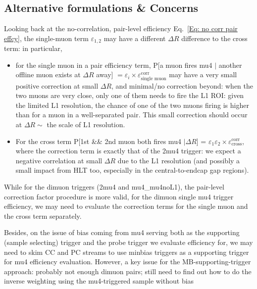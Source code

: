 \documentclass[11pt]{article}
\begin{document}
\subsection*{Alternative formulations \& Concerns}
Looking back at the no-correlation, pair-level efficiency Eq.~\ref{Eq: no corr pair effcy}, the single-muon term $\varepsilon_{1,2}$ may have a different $\Delta R$ difference to the cross term: in particular,
\begin{itemize}
    \item for the single muon in a pair efficiency term, P[a muon fires mu4 $\mid$ another offline muon exists at $\Delta R$ away] $= \varepsilon_{i} \times \varepsilon^{\textrm{corr}}_{\textrm{single muon}}$ may have a very small positive correction at small $\Delta R$, and minimal/no correction beyond: when the two muons are very close, only one of them needs to fire the L1 ROI: given the limited L1 resolution, the chance of one of the two muons firing is higher than for a muon in a well-separated pair. This small correction should occur at $\Delta R \sim$ the scale of L1 resolution.
    \item For the cross term P[1st \&\& 2nd muon both fires mu4 $\mid\Delta R$] = $\varepsilon_{1} \varepsilon_{2} \times \varepsilon^{\textrm{corr}}_{\textrm{cross}}$, where the correction term is exactly that of the 2mu4 trigger: we expect a negative correlation at small $\Delta R$ due to the L1 resolution (and possibly a small impact from HLT too, especially in the central-to-endcap gap regions).
\end{itemize}
While for the dimuon triggers (2mu4 and mu4\_mu4noL1), the pair-level correction factor procedure is more valid, for the dimuon single mu4 trigger efficiency, we may need to evaluate the correction terms for the single muon and the cross term separately.

Besides, on the issue of bias coming from mu4 serving both as the supporting (sample selecting) trigger and the probe trigger we evaluate efficiency for, we may need to skim CC and PC streams to use minbias triggers as a supporting trigger for mu4 efficiency evaluation. However, a key issue for the MB-supporting-trigger approach: probably not enough dimuon pairs; still need to find out how to do the inverse weighting using the mu4-triggered sample without bias
\end{document}
